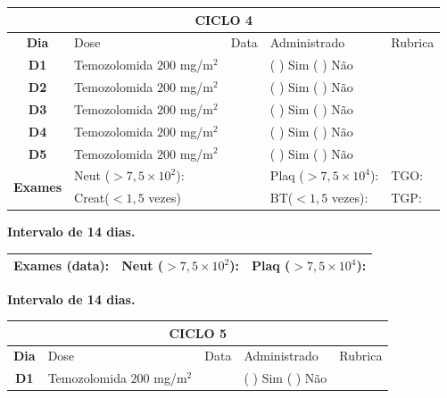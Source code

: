 \documentclass[11pt,a4paper,oldfontcommands]{memoir}
\begin{document}
\begin{center}
\begin{table}[H]
\begin{tabular}{p{1cm}p{5cm}|p{1cm}|p{4.5cm}|p{2cm}}
	\hline
	\multicolumn{5}{c}{\textbf{CICLO 4}}\\
\hline
    \multicolumn{1}{c|}{\multirow{1}{*}{\textbf{Dia}}}&{Dose}&{Data}&{Administrado}&{Rubrica} \\
    \hline
    \multicolumn{1}{c|}{\multirow{1}{*}{\textbf{D1}}}&{Temozolomida \(200\) mg/m\(^2\)}&&{(  ) Sim (  ) Não}&\\
    \multicolumn{1}{c|}{\multirow{1}{*}{\textbf{D2}}}&{Temozolomida \(200\) mg/m\(^2\)}&&{(  ) Sim (  ) Não}&\\
    \multicolumn{1}{c|}{\multirow{1}{*}{\textbf{D3}}}&{Temozolomida \(200\) mg/m\(^2\)}&&{(  ) Sim (  ) Não}&\\
    \multicolumn{1}{c|}{\multirow{1}{*}{\textbf{D4}}}&{Temozolomida \(200\) mg/m\(^2\)}&&{(  ) Sim (  ) Não}&\\
    \multicolumn{1}{c|}{\multirow{1}{*}{\textbf{D5}}}&{Temozolomida \(200\) mg/m\(^2\)}&&{(  ) Sim (  ) Não}&\\
    \hline
    \multicolumn{1}{c|}{\multirow{2}{*}{\textbf{Exames}}}&\multicolumn{2}{l|}{Neut (\(>7,5\times10^2\)):}&{Plaq (\(>7,5\times10^4\)):}&{TGO:}\\
    \cline{2-5}
    \multicolumn{1}{c|}{\multirow{2}{*}{{}}}&\multicolumn{2}{l|}{Creat(\(<1,5\) vezes)}&{BT(\(<1,5\) vezes):}&{TGP:}
    \\
    \hline
\end{tabular}
\end{table}
\textbf{Intervalo de 14 dias.}
\begin{table}[H]
\begin{tabular}{p{5cm}|p{5cm}|p{4.7cm}}
    \hline
    \textbf{Exames (data):}&{Neut (\(>7,5\times10^2\)):}&{Plaq (\(>7,5\times10^4\)):}
    \\
    \hline
\end{tabular}
\end{table}
\textbf{Intervalo de 14 dias.}
\begin{table}[H]
\begin{tabular}{p{1cm}p{5cm}|p{1cm}|p{4.5cm}|p{2cm}}
	\hline
	\multicolumn{5}{c}{\textbf{CICLO 5}}\\
\hline
    \multicolumn{1}{c|}{\multirow{1}{*}{\textbf{Dia}}}&{Dose}&{Data}&{Administrado}&{Rubrica} \\
    \hline
    \multicolumn{1}{c|}{\multirow{1}{*}{\textbf{D1}}}&{Temozolomida \(200\) mg/m\(^2\)}&&{(  ) Sim (  ) Não}&\\

\end{tabular}
\end{table}
\end{center}
\end{document}
